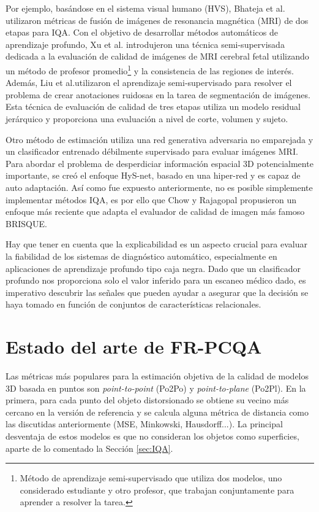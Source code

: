 Por ejemplo, basándose en el sistema visual humano (HVS), 
Bhateja et al.\cite{MultiModalMRIFusionMethod} utilizaron métricas de fusión
de imágenes de resonancia magnética (MRI) de dos etapas para IQA.
Con el objetivo de desarrollar métodos automáticos de aprendizaje profundo,
Xu et al.\cite{SemiSupervisedMRIFetalBrain} introdujeron una técnica semi-supervisada dedicada a la evaluación de 
calidad de imágenes de MRI cerebral fetal utilizando un método de 
profesor promedio\footnote{
Método de aprendizaje semi-supervisado que utiliza dos modelos, 
uno considerado estudiante y otro profesor, que trabajan conjuntamente para aprender
a resolver la tarea.
} y la consistencia de las regiones de interés. 
Además, Liu et al.\cite{IQAForPediatricMRIWithNoisySegmentation}utilizaron el aprendizaje semi-supervisado para resolver 
el problema de crear anotaciones ruidosas en la tarea de segmentación de imágenes. 
Esta técnica de evaluación de calidad de tres etapas utiliza un modelo residual 
jerárquico y proporciona una evaluación a nivel de corte, volumen y sujeto. 

Otro método de estimación utiliza una red generativa adversaria no emparejada 
y un clasificador entrenado débilmente supervisado para evaluar imágenes MRI\cite{MIGAN}.
Para abordar el problema de desperdiciar información espacial 3D potencialmente importante, 
se creó el enfoque HyS-net\cite{Hys-net}, basado en una hiper-red y es capaz de 
auto adaptación\cite{Hys-net}. Así como fue expuesto anteriormente, no es posible 
simplemente implementar métodos IQA, es por ello que Chow y Rajagopal \cite{MedicalBRISQUE} 
propusieron un enfoque más reciente que adapta el evaluador de calidad de imagen más famoso BRISQUE\cite{BRISQUE}.

Hay que tener en cuenta que la explicabilidad es un aspecto crucial 
para evaluar la fiabilidad de los sistemas de diagnóstico automático, 
especialmente en aplicaciones de aprendizaje profundo tipo caja negra. 
Dado que un clasificador profundo nos proporciona solo el valor inferido 
para un escaneo médico dado, es imperativo descubrir las señales que pueden 
ayudar a asegurar que la decisión se haya tomado en función de conjuntos de 
características relacionales.

\section{Estado del arte de FR-PCQA}
Las métricas más populares para la estimación objetiva de la calidad de modelos 
3D basada en puntos son \emph{point-to-point} (Po2Po)\cite{PointToPoint} y
\emph{point-to-plane} (Po2Pl)\cite{PointToPlane}. 
En la primera, para cada punto del objeto distorsionado se obtiene su vecino más cercano en la versión de referencia y 
se calcula alguna métrica de distancia como las discutidas anteriormente (MSE, Minkowski, Hausdorff...). 
La principal desventaja de estos modelos es que no consideran los objetos como 
superficies, aparte de lo comentado la Sección \ref{sec:IQA}.


